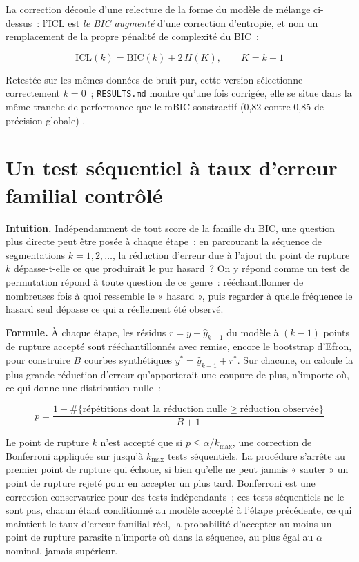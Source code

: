 \documentclass[11pt]{article}
\newcommand{\code}[1]{\texttt{#1}}
\begin{document}
La correction découle d'une relecture de la forme du modèle de mélange
ci-dessus~: l'ICL est \emph{le BIC augmenté} d'une correction d'entropie,
et non un remplacement de la propre pénalité de complexité du BIC~:

\begin{equation}
\mathrm{ICL}(k) = \mathrm{BIC}(k) + 2\,H(K), \qquad K = k+1
\end{equation}

Retestée sur les mêmes données de bruit pur, cette version sélectionne
correctement $k = 0$~; \code{RESULTS.md} montre qu'une fois corrigée, elle
se situe dans la même tranche de performance que le mBIC soustractif (0,82
contre 0,85 de précision globale) \citep{biernacki2000}.

\section{Un test séquentiel à taux d'erreur familial contrôlé}

\textbf{Intuition.} Indépendamment de tout score de la famille du BIC, une
question plus directe peut être posée à chaque étape~: en parcourant la
séquence de segmentations $k = 1, 2, \dots$, la réduction d'erreur due à
l'ajout du point de rupture $k$ dépasse-t-elle ce que produirait le pur
hasard~? On y répond comme un test de permutation répond à toute question
de ce genre~: rééchantillonner de nombreuses fois à quoi ressemble le
« hasard », puis regarder à quelle fréquence le hasard seul dépasse ce qui
a réellement été observé.

\textbf{Formule.} À chaque étape, les résidus $r = y - \hat y_{k-1}$ du
modèle à $(k-1)$ points de rupture accepté sont rééchantillonnés avec
remise, encore le bootstrap d'Efron, pour construire $B$ courbes
synthétiques $y^\ast = \hat y_{k-1} + r^\ast$. Sur chacune, on calcule la
plus grande réduction d'erreur qu'apporterait une coupure de plus,
n'importe où, ce qui donne une distribution nulle~:

\begin{equation}
p = \frac{1 + \#\{\text{répétitions dont la réduction nulle} \ge \text{réduction observée}\}}{B + 1}
\end{equation}

Le point de rupture $k$ n'est accepté que si $p \le \alpha / k_{\max}$, une
correction de Bonferroni appliquée sur jusqu'à $k_{\max}$ tests
séquentiels. La procédure s'arrête au premier point de rupture qui échoue,
si bien qu'elle ne peut jamais « sauter » un point de rupture rejeté pour
en accepter un plus tard. Bonferroni est une correction conservatrice pour
des tests indépendants~; ces tests séquentiels ne le sont pas, chacun étant
conditionné au modèle accepté à l'étape précédente, ce qui maintient le
taux d'erreur familial réel, la probabilité d'accepter au moins un point de
rupture parasite n'importe où dans la séquence, au plus égal au $\alpha$
nominal, jamais supérieur.
\end{document}
